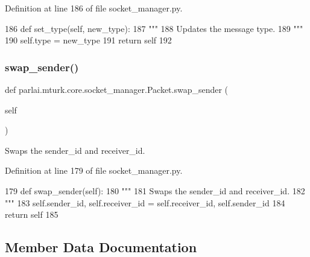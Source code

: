 Definition at line 186 of file socket\+\_\+manager.\+py.


\begin{DoxyCode}
186     \textcolor{keyword}{def }set\_type(self, new\_type):
187         \textcolor{stringliteral}{"""}
188 \textcolor{stringliteral}{        Updates the message type.}
189 \textcolor{stringliteral}{        """}
190         self.type = new\_type
191         \textcolor{keywordflow}{return} self
192 
\end{DoxyCode}
\mbox{\label{classparlai_1_1mturk_1_1core_1_1socket__manager_1_1Packet_a369524e6a2a2628fe23d5277fb90a600}} 
\subsubsection{\texorpdfstring{swap\+\_\+sender()}{swap\_sender()}}
{\footnotesize\ttfamily def parlai.\+mturk.\+core.\+socket\+\_\+manager.\+Packet.\+swap\+\_\+sender (\begin{DoxyParamCaption}\item[{}]{self }\end{DoxyParamCaption})}

\begin{DoxyVerb}Swaps the sender_id and receiver_id.
\end{DoxyVerb}
 

Definition at line 179 of file socket\+\_\+manager.\+py.


\begin{DoxyCode}
179     \textcolor{keyword}{def }swap\_sender(self):
180         \textcolor{stringliteral}{"""}
181 \textcolor{stringliteral}{        Swaps the sender\_id and receiver\_id.}
182 \textcolor{stringliteral}{        """}
183         self.sender\_id, self.receiver\_id = self.receiver\_id, self.sender\_id
184         \textcolor{keywordflow}{return} self
185 
\end{DoxyCode}


\subsection{Member Data Documentation}
\mbox{\label{classparlai_1_1mturk_1_1core_1_1socket__manager_1_1Packet_a676008ae4aaa55d7551a94d246b1b931}} 
